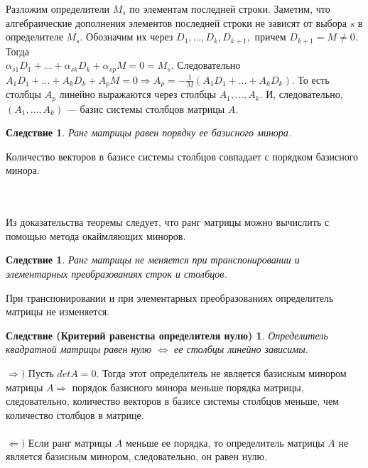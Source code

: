 \begin{Proof}
	Разложим определители $M_s$ по элементам последней строки. Заметим, что алгебраические дополнения элементов последней строки не зависят от выбора $s$ в определителе $M_s$. Обозначим их через $D_1,\dots, D_k,D_{k+1},$ причем $D_{k+1} = M \ne 0$. Тогда\\
	$\alpha_{s1}D_{1} + \ldots +\alpha_{sk}D_{k} + \alpha_{sp}M = 0 = M_{s}$. Следовательно\\
	$A_{1}D_{1} + \ldots + A_{k}D_{k} + A_{p}M = 0\Rightarrow A_p = -\frac{1}{M}(A_{1}D_{1} + \ldots + A_{k}D_{k})$. То есть столбцы $A_p$ линейно выражаются через столбцы $A_1,\dots, A_k$. И, следовательно, $(A_1,\dots, A_k)$ --- базис системы столбцов матрицы $A$.
\end{Proof}
\newtheorem*{cor10_7_1}{Следствие}\begin{cor10_7_1}Ранг матрицы равен порядку ее базисного минора.
\end{cor10_7_1}\begin{Proof}
	Количество векторов в базисе системы столбцов совпадает с порядком базисного минора.
\end{Proof}\\\\
Из доказательства теоремы следует, что ранг матрицы можно вычислить с помощью метода окаймляющих миноров.
\newtheorem*{cor10_7_2}{Следствие}\begin{cor10_7_2}Ранг матрицы не меняется при транспонировании и элементарных преобразованиях строк и столбцов.
\end{cor10_7_2}\begin{Proof}
	При транспонировании и при элементарных преобразованиях определитель матрицы не изменяется.
\end{Proof}
\newtheorem*{cor10_7_3}{Следствие (Критерий равенства определителя нулю)}\begin{cor10_7_3}Определитель квадратной матрицы равен нулю $\Longleftrightarrow$ ее столбцы линейно зависимы.
\end{cor10_7_3}\begin{Proof}
	$\Rightarrow)$ Пусть $detA = 0$. Тогда этот определитель не является базисным минором матрицы $A\Rightarrow $ порядок базисного минора меньше порядка матрицы, следовательно, количество векторов в базисе системы столбцов меньше, чем количество столбцов в матрице.\\\\
	$\Leftarrow)$ Если ранг матрицы $A$ меньше ее порядка, то определитель матрицы $A$ не является базисным минором, следовательно, он равен нулю.
\end{Proof}
